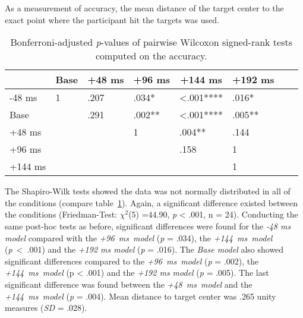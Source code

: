 \documentclass[sigconf]{acmart}
\begin{document}
As a measurement of accuracy, the mean distance of the target center to the exact point where the participant hit the targets was used. 
\begin{table}[H]
\caption{Bonferroni-adjusted \textit{p}-values of pairwise Wilcoxon signed-rank tests computed on the accuracy.}
\label{table:ac_p}
\begin{tabular}{llllllll}
\toprule
         	& \multicolumn{1}{c}{Base} 	& \multicolumn{1}{c}{+48 ms} 	& \multicolumn{1}{c}{+96 ms} 	& \multicolumn{1}{c}{+144 ms} 	& \multicolumn{1}{c}{+192 ms}    	\\ \midrule
-48 ms   	& 1							& \phantom{<}.207			 	& \phantom{<}.034*		 		& <.001**** 						& \phantom{<}.016* 					\\
Base     	&       						& \phantom{<}.291	  		 	& \phantom{<}.002** 	 		& <.001**** 						& \phantom{<}.005** 					\\
+48 ms  	&       						&        						& 1		  	 					& \phantom{<}.004**  			& \phantom{<}.144   					\\
+96 ms  	&       						&        						&            					& \phantom{<}.158     			& 1      							\\
+144 ms 	&       						&        						&            					&            					& 1      							\\ \bottomrule
\end{tabular}
\end{table}
The Shapiro-Wilk tests showed the data was not normally distributed in all of the conditions (compare table~\ref{table:ac_p}). Again, a significant difference existed between the conditions (Friedman-Test: $\chi^2$(5) =44.90, \textit{p} < .001, n = 24). Conducting the same post-hoc tests as before, significant differences were found for the \textit{-48 ms model} compared with the \mbox{\textit{+96 ms model}} (\textit{p} = .034), the \mbox{\textit{+144 ms model}} \mbox{(\textit{p} < .001)} and  the \textit{+192 ms model} (\textit{p} = .016). The \textit{Base model} also showed significant differences compared to the \mbox{\textit{+96 ms model}} (\textit{p} = .002), the \mbox{\textit{+144 ms model}} (p < .001) and  the \textit{+192 ms model} (\textit{p} = .005). The last significant difference was found between the \mbox{\textit{+48 ms model}} and the \mbox{\textit{+144 ms model}} (\textit{p} = .004). Mean distance to target center was .265 unity measures (\textit{SD} = .028).
\end{document}
